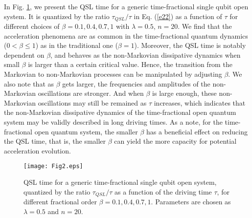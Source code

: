 \documentclass[
showpacs,  %
showkeys,  %
aps,       %
amsthm,    %
amsmath,   %
amsfonts,  %
amssymb    %
]{revtex4-1}          %
\begin{document}
In Fig. \ref{Fig2}, we present the QSL time for a generic time-fractional single qubit open system. It is quantized by the ratio ${\tau _{QSL}}/{\tau}$ in Eq. (\ref{e22}) as a function of $\tau$ for different choices of $\beta=0.1, 0.4, 0.7, 1$ with $\lambda = 0.5$, $n=20$. We find that the acceleration phenomena are as common in the time-fractional quantum dynamics ($0<\beta\leq1$) as in the traditional one ($\beta=1$). Moreover, the QSL time is notably dependent on $\beta$, and behaves as the non-Markovian dissipative dynamics when small $\beta$ is larger than a certain critical value. Hence, the transition from the Markovian to non-Markovian processes can be manipulated by adjusting $\beta$. We also note that as $\beta$ gets larger, the frequencies and amplitudes of the non-Markovian oscillations are stronger. And when $\beta$ is large enough, these non-Markovian oscillations may still be remained as $\tau$ increases, which indicates that the non-Markovian dissipative dynamics of the time-fractional open quantum system may be validly described in long driving times. As a note, for the time-fractional open quantum system, the smaller $\beta$ has a beneficial effect on reducing the QSL time, that is, the smaller $\beta$ can yield the more capacity for potential acceleration evolution.
\begin{figure}
\texttt{[image: Fig2.eps]}
\caption{QSL time for a generic time-fractional single qubit open system, quantized by the ratio ${\tau _{QSL}}/{\tau}$ as a function of the driving time $\tau$, for different fractional order $\beta=0.1, 0.4, 0.7, 1$. Parameters are chosen as $\lambda = 0.5$ and $n=20$.}
\label{Fig2}
\end{figure}
\end{document}
